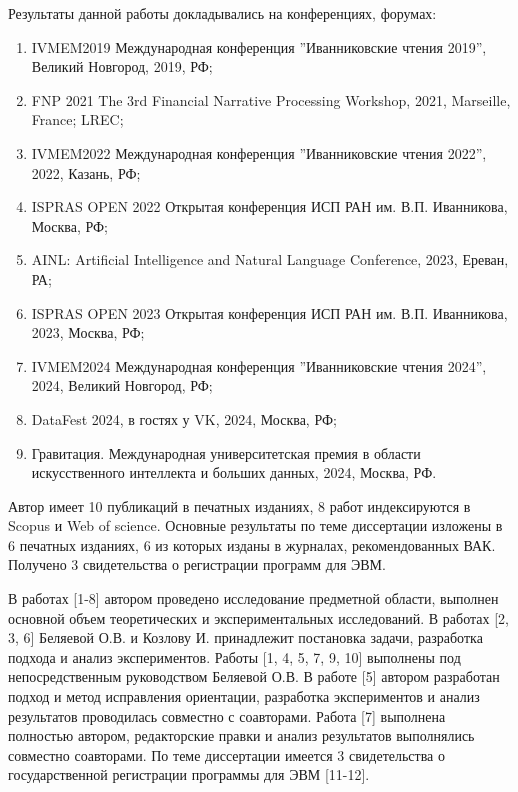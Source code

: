 \underline{\textbf{{\probationTXT}}} Результаты данной работы докладывались на конференциях, форумах:
\begin{enumerate}
    \item IVMEM2019 Международная конференция ”Иванниковские чтения 2019”, Великий Новгород, 2019, РФ;
    \item FNP 2021 The 3rd Financial Narrative Processing Workshop, 2021, Marseille, France; LREC;
    \item IVMEM2022 Международная конференция ”Иванниковские чтения 2022”, 2022, Казань, РФ; 
    \item ISPRAS OPEN 2022 Открытая конференция ИСП РАН им. В.П. Иванникова, Москва, РФ;
    \item AINL: Artificial Intelligence and Natural Language Conference, 2023, Ереван, РА;
    \item ISPRAS OPEN 2023 Открытая конференция ИСП РАН им. В.П. Иванникова, 2023, Москва, РФ;
    \item IVMEM2024 Международная конференция ”Иванниковские чтения 2024”, 2024, Великий Новгород, РФ;
    \item DataFest 2024, в гостях у VK, 2024, Москва, РФ;
    \item Гравитация. Международная университетская премия в области искусственного интеллекта и больших данных, 2024, Москва, РФ.
\end{enumerate}



\underline{\textbf{{\publicationsTXT}}} Автор имеет 10 публикаций в печатных изданиях, 8 работ индексируются в Scopus и Web of science. Основные результаты по теме диссертации изложены в 6  печатных изданиях, 6 из которых изданы в журналах, рекомендованных ВАК. Получено 3 свидетельства о регистрации программ для ЭВМ. 

В работах [1-8] автором проведено исследование предметной области, выполнен основной объем теоретических и экспериментальных исследований. В работах [2, 3, 6] Беляевой О.В. и Козлову И. принадлежит постановка задачи, разработка подхода и анализ экспериментов.  Работы [1, 4, 5, 7, 9, 10] выполнены под непосредственным руководством Беляевой О.В. В работе [5] автором разработан подход и метод исправления ориентации, разработка экспериментов и анализ результатов проводилась совместно с соавторами. Работа [7] выполнена полностью автором, редакторские правки и анализ результатов выполнялись совместно соавторами. По теме диссертации имеется 3 свидетельства о государственной регистрации программы для ЭВМ [11-12].



